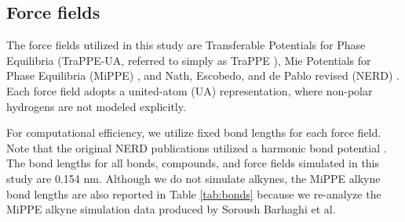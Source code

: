 \documentclass[journal=jced,manuscript=article]{achemso}
\begin{document}
\subsection{Force fields} \label{sec: Force fields}

    The force fields utilized in this study are Transferable Potentials for Phase Equilibria (TraPPE-UA, referred to simply as TraPPE \cite{TraPPE,Martin1999,Keasler2012}), Mie Potentials for Phase Equilibria (MiPPE) \cite{Mie,Potoff_branched,Barhaghi2017}, and Nath, Escobedo, and de Pablo revised (NERD) \cite{NERD,Nath2001}. Each force field adopts a united-atom (UA) representation, where non-polar hydrogens are not modeled explicitly. 
    
    
    For computational efficiency, we utilize fixed bond lengths for each force field. Note that the original NERD publications utilized a harmonic bond potential \cite{NERD}. The bond lengths for all bonds, compounds, and force fields simulated in this study are 0.154 nm. Although we do not simulate alkynes, the MiPPE alkyne bond lengths are also reported in Table \ref{tab:bonds} because we re-analyze the MiPPE alkyne simulation data produced by Soroush Barhaghi et al.
    
\end{document}
